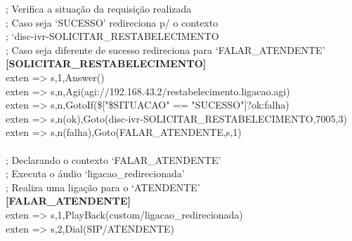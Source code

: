 \begin{apendicesenv}
; Verifica a situação da requisição realizada \\
; Caso seja ‘SUCESSO’ redireciona p/ o contexto \\
; ‘disc-ivr-SOLICITAR\_RESTABELECIMENTO \\
; Caso seja diferente de sucesso redireciona para ‘FALAR\_ATENDENTE’ \\
\textbf{[SOLICITAR\_RESTABELECIMENTO]} \\
exten => s,1,Answer() \\
exten => s,n,Agi(agi://192.168.43.2/restabelecimento.ligacao.agi) \\
exten => s,n,GotoIf(\$["\${SITUACAO}" == "SUCESSO"]?ok:falha) \\
exten => s,n(ok),Goto(disc-ivr-SOLICITAR\_RESTABELECIMENTO,7005,3) \\
exten => s,n(falha),Goto(FALAR\_ATENDENTE,s,1) \\
 \\
; Declarando o contexto ‘FALAR\_ATENDENTE’ \\
; Executa o áudio ‘ligacao\_redirecionada’ \\
; Realiza uma ligação para o ‘ATENDENTE’ \\
\textbf{[FALAR\_ATENDENTE]} \\
exten => s,1,PlayBack(custom/ligacao\_redirecionada) \\
exten => s,2,Dial(SIP/ATENDENTE) \\


\chapter{\fontsize{12}{1} }


\end{apendicesenv}
